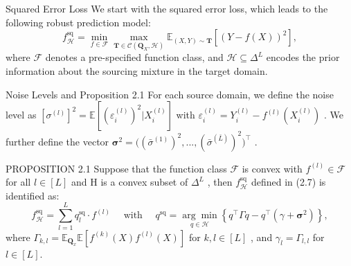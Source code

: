 \documentclass{beamer}
\begin{document}
\begin{frame}{Squared Error Loss}
    We start with the squared error loss, which leads to the following robust prediction model:
    \begin{equation*}
        f _ {\mathcal {H}} ^ {\mathrm{sq}} = \min _ {f \in \mathcal {F}} \max _ {\mathbf {T} \in \mathcal {C} (\mathbf {Q} _ {X}, \mathcal {H})} \mathbb {E} _ {(X, Y) \sim \mathbf {T}} [ (Y - f (X)) ^ {2} ], \tag {2.7}
    \end{equation*}
    where $\mathcal { F }$ denotes a pre-specified function class, and $\mathcal { H } \subseteq \Delta ^ { L }$ encodes the prior information about the sourcing mixture in the target domain.
\end{frame}

\begin{frame}{Noise Levels and Proposition 2.1}
    For each source domain, we define the noise level as $[ \sigma ^ { ( l ) } ] ^ { 2 } = \mathbb { E } [ ( \varepsilon _ { i } ^ { ( l ) } ) ^ { 2 } | X _ { i } ^ { ( l ) } ]$ with $\varepsilon _ { i } ^ { ( l ) } = Y _ { i } ^ { ( l ) } - f ^ { ( l ) } ( X _ { i } ^ { ( l ) } )$ . We further define the vector $\pmb { \sigma } ^ { 2 } = \big ( ( \bar { \sigma } ^ { ( 1 ) } ) ^ { 2 } , . . . , ( \bar { \sigma } ^ { ( \bar { L } ) } ) ^ { 2 } \big ) ^ { \intercal }$ .

    \begin{block}{PROPOSITION 2.1}
        Suppose that the function class $\mathcal { F }$ is convex with $f ^ { ( l ) } \in \mathcal { F }$ for all $l \in [ L ]$ and H is a convex subset of $\Delta ^ { L }$ , then $f _ { \mathcal { H } } ^ { \mathrm { s q } }$ defined in (2.7) is identified as:
        \begin{equation*}
            f _ {\mathcal {H}} ^ {\mathrm{sq}} = \sum_ {l = 1} ^ {L} q _ {l} ^ {\mathrm{sq}} \cdot f ^ {(l)} \quad \text { with } \quad q ^ {\mathrm{sq}} = \underset {q \in \mathcal {H}} {\arg \min} \left\{q ^ {\intercal} \Gamma q - q ^ {\intercal} (\gamma + \boldsymbol {\sigma} ^ {2}) \right\}, \tag {2.8}
        \end{equation*}
        where $\Gamma _ { k , l } = \mathbb { E } _ { \mathbf { Q } _ { x } } \mathbb { E } [ f ^ { ( k ) } ( X ) f ^ { ( l ) } ( X ) ]$ for $k , l \in [ L ]$ , and $\gamma _ { l } = \Gamma _ { l , l }$ for $l \in [ L ]$.
    \end{block}
\end{frame}
\end{document}

